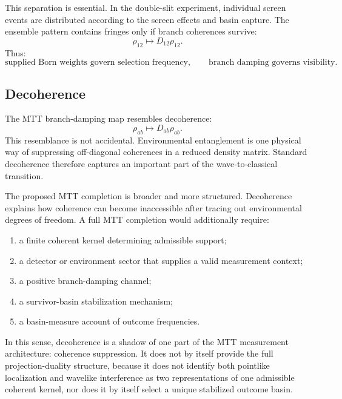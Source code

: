 \documentclass[11pt]{article}
\begin{document}
This separation is essential. In the double-slit experiment, individual screen events are
distributed according to the screen effects and basin capture. The ensemble pattern contains
fringes only if branch coherences survive:
\begin{equation}
  \rho_{12}\mapsto D_{12}\rho_{12}.
\end{equation}
Thus:
\begin{equation}
  \boxed{
  \text{supplied Born weights govern selection frequency},
  }
  \qquad
  \boxed{
  \text{branch damping governs visibility}.
  }
\end{equation}

\subsection{Decoherence}
\label{subsec:relation-decoherence}

The MTT branch-damping map resembles decoherence:
\begin{equation}
  \rho_{ab}\mapsto D_{ab}\rho_{ab}.
\end{equation}
This resemblance is not accidental. Environmental entanglement is one physical way of
suppressing off-diagonal coherences in a reduced density matrix. Standard decoherence
therefore captures an important part of the wave-to-classical transition.

The proposed MTT completion is broader and more structured. Decoherence explains how
coherence can become inaccessible after tracing out environmental degrees of freedom. A
full MTT completion would additionally require:
\begin{enumerate}[label=(\roman*)]
  \item a finite coherent kernel determining admissible support;
  \item a detector or environment sector that supplies a valid measurement context;
  \item a positive branch-damping channel;
  \item a survivor-basin stabilization mechanism;
  \item a basin-measure account of outcome frequencies.
\end{enumerate}

In this sense, decoherence is a shadow of one part of the MTT measurement architecture:
coherence suppression. It does not by itself provide the full projection-duality structure,
because it does not identify both pointlike localization and wavelike interference as two
representations of one admissible coherent kernel, nor does it by itself select a unique
stabilized outcome basin.
\end{document}
